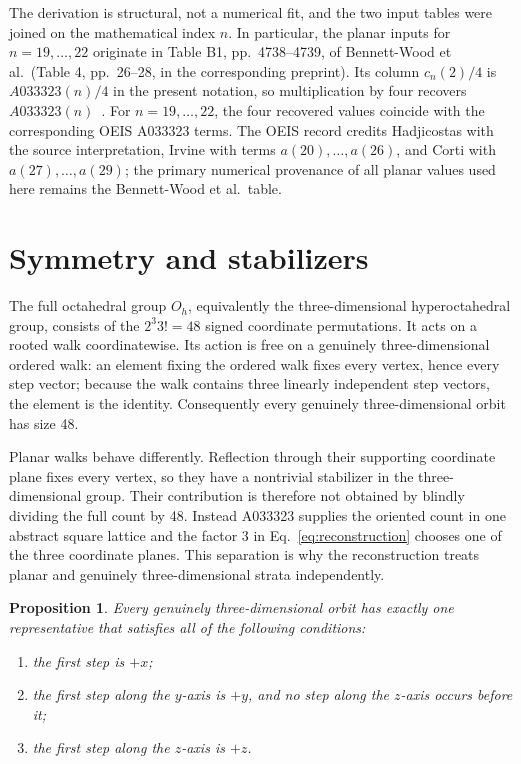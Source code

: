 \documentclass[11pt]{article}
\newtheorem{proposition}[theorem]{Proposition}
\theoremstyle{definition}
\theoremstyle{remark}
\begin{document}
The derivation is structural, not a numerical fit, and the two input tables
were joined on the mathematical index $n$.  In particular, the planar inputs
for $n=19,\ldots,22$ originate in Table B1, pp.~4738--4739, of Bennett-Wood
et al.\ (Table 4, pp.~26--28, in the corresponding preprint).  Its column
$c_n(2)/4$ is $A033323(n)/4$ in the present notation, so multiplication by
four recovers $A033323(n)$~\cite{BennettWoodEtAl1998,OEISA033323}.  For
$n=19,\ldots,22$, the four recovered values coincide with the corresponding
OEIS A033323 terms.  The OEIS record
credits Hadjicostas with the source interpretation, Irvine with terms
$a(20),\ldots,a(26)$, and Corti with $a(27),\ldots,a(29)$; the primary
numerical provenance of all planar values used here remains the
Bennett-Wood et al.\ table.

\section{Symmetry and stabilizers}

The full octahedral group $O_h$, equivalently the three-dimensional
hyperoctahedral group, consists of the $2^3 3!=48$ signed coordinate
permutations.  It acts on a rooted walk coordinatewise.  Its action is free on
a genuinely three-dimensional ordered walk: an element fixing the ordered
walk fixes every vertex, hence every step vector; because the walk contains
three linearly independent step vectors, the element is the identity.
Consequently every genuinely three-dimensional orbit has size 48.

Planar walks behave differently.  Reflection through their supporting
coordinate plane fixes every vertex, so they have a nontrivial stabilizer in
the three-dimensional group.  Their contribution is therefore not obtained by
blindly dividing the full count by 48.  Instead A033323 supplies the oriented
count in one abstract square lattice and the factor 3 in
Eq.~\eqref{eq:reconstruction} chooses one of the three coordinate planes.  This
separation is why the reconstruction treats planar and genuinely
three-dimensional strata independently.

\begin{proposition}
Every genuinely three-dimensional orbit has exactly one representative that
satisfies all of the following conditions:
\begin{enumerate}
\item the first step is $+x$;
\item the first step along the $y$-axis is $+y$, and no step along the $z$-axis
      occurs before it;
\item the first step along the $z$-axis is $+z$.
\end{enumerate}
\label{prop:canonical}
\end{proposition}
\end{document}
